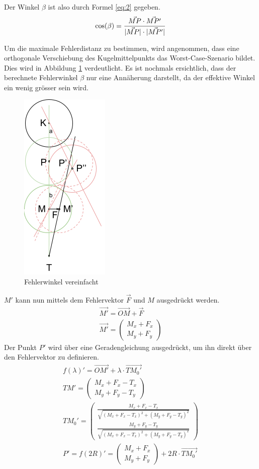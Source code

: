 Der Winkel $\beta$ ist also durch Formel \ref{eq:2} gegeben.
\begin{align}
    \cos(\beta) = \frac{\vec{MP} \cdot \vec{MP'}}{\lvert \vec{MP} \rvert \cdot \lvert \vec{MP'} \rvert}\label{eq:2}
\end{align}

Um die maximale Fehlerdistanz zu bestimmen, wird angenommen, dass eine orthogonale Verschiebung des Kugelmittelpunkts
das Worst-Case-Szenario bildet. Dies wird in Abbildung \ref{fig:fehlerwinkel_vereinfachung} verdeutlicht. Es ist nochmals ersichtlich, dass der berechnete Fehlerwinkel $\beta$
nur eine Annäherung darstellt, da der effektive Winkel ein wenig grösser sein wird.
\begin{figure}[h!]
    \begin{center}
        \includegraphics[width=0.2\linewidth]{../common/07_appendix/resources/03_fehlerwinkel_vereinfacht.png}
    \end{center}
    \caption{Fehlerwinkel vereinfacht}
    \label{fig:fehlerwinkel_vereinfachung}
\end{figure}
$M'$ kann nun mittels dem Fehlervektor $\vec{F}$ und $M$ ausgedrückt werden.
\begin{align}
    \vec{M'} = \vec{OM} + \vec{F}\\
    \vec{M'} = \begin{pmatrix}M_x + F_x\\M_y + F_y\end{pmatrix}
\end{align}
Der Punkt $P'$ wird über eine Geradengleichung ausgedrückt, um ihn direkt über den Fehlervektor zu definieren.
\begin{align}
    f(\lambda)' = \vec{OM'} + \lambda \cdot \vec{TM_0'}\\
    TM' = \begin{pmatrix}M_x + F_x - T_x\\M_y + F_y - T_y\end{pmatrix}\\
    TM_0' = \begin{pmatrix}\frac{M_x + F_x - T_x}{\sqrt{(M_x + F_x - T_x)^2 + (M_y + F_y - T_y)^2}}\\\frac{M_y + F_y - T_y}{\sqrt{(M_x + F_x - T_x)^2 + (M_y + F_y - T_y)^2}}\end{pmatrix}\\
    P' = f(2R)' = \begin{pmatrix}M_x + F_x\\M_y + F_y\end{pmatrix} + 2R \cdot \vec{TM_0'}
\end{align}
